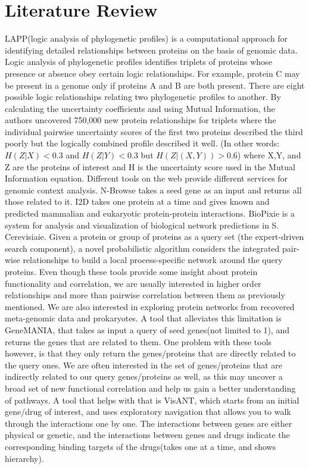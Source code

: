 \documentclass{ucetd}
\begin{document}
\chapter{Literature Review}
LAPP(logic analysis of phylogenetic profiles) is a computational approach for identifying detailed relationships between proteins on the basis of genomic data. Logic analysis of phylogenetic profiles identifies triplets of proteins whose presence or absence obey certain logic relationships. For example, protein C may be present in a genome only if proteins A and B are both present\cite{1}. 
There are eight possible logic relationships relating two phylogenetic profiles to another. By calculating the uncertainty coefficients and using Mutual Information, the authors uncovered 750,000 new protein relationships for triplets where the individual pairwise uncertainty scores of the first two proteins described the third poorly but the logically combined profile described it well. (In other words: $H(Z|X)<0.3$ and $H(Z|Y) < 0.3$ but $H(Z|(X,Y)) > 0.6$) where X,Y, and Z are the proteins of interest and H is the uncertainty score used in the Mutual Information equation.
Different tools on the web provide different services for genomic context analysis. 
N-Browse takes a seed gene as an input and returns all those related to it. I2D takes one protein at a time and gives known and predicted mammalian and eukaryotic protein-protein interactions. BioPixie is a system for analysis and visualization of biological network predictions in S. Cerevisiaie. Given a protein or group of proteins as a query set (the expert-driven search component), a novel probabilistic algorithm considers the integrated pair-wise relationships to build a local process-specific network around the query proteins. Even though these tools provide some insight about protein functionality and correlation, we are usually interested in higher order relationships and more than pairwise correlation between them as previously mentioned. We are also interested in exploring protein networks from recovered meta-genomic data and prokaryotes. A tool that alleviates this limitation is GeneMANIA, that takes as input a query of seed genes(not limited to 1), and returns the genes that are related to them. One problem with these tools however, is that they only return the genes/proteins that are directly related to the query ones. We are often interested in the set of genes/proteins that are indirectly related to our query genes/proteins as well, as this may uncover a broad set of new functional correlation and help us gain a better understanding of pathways. A tool that helps with that is VisANT, which starts from an initial gene/drug of interest, and uses exploratory navigation that allows you to walk through the interactions one by one. The interactions between genes are either physical or genetic, and the interactions between genes and drugs indicate the corresponding binding targets of the drugs(takes one at a time, and shows hierarchy). 
\end{document}
